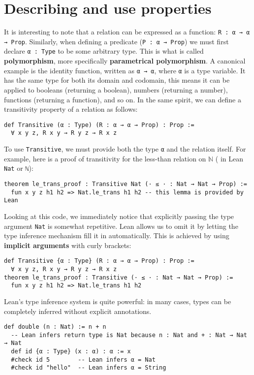 \section{Describing and use properties}
It is interesting to note that a relation can be expressed as a function:
\lstinline[language=lean]|R : α → α → Prop|.
Similarly, when defining a predicate (\lstinline[language=lean]|P : α → Prop|) we must first declare
\lstinline[language=lean]|α : Type| to be some arbitrary type.
This is what is called \textbf{polymorphism}, more specifically \textbf{parametrical polymorphism}.
A canonical example is the identity function, written as
\lstinline[language=lean]|α → α|, where
\lstinline[language=lean]|α| is a type variable.
It has the same type for
both its domain and codomain, this means it can be
applied to booleans (returning a boolean), numbers (returning a number),
functions (returning a function), and so on.
In the same spirit, we can define a transitivity property of a relation as follows:
\begin{lstlisting}[language=lean]
def Transitive (α : Type) (R : α → α → Prop) : Prop :=
  ∀ x y z, R x y → R y z → R x z
\end{lstlisting}
To use \lstinline[language=lean]|Transitive|, we must provide both the type
\lstinline[language=lean]|α| and the relation itself.
For example, here is a proof of transitivity for the less-than relation on
$\mathbb{N}$ ( in Lean \lstinline[language=lean]|Nat| or \lstinline[language=lean]|ℕ|):
\begin{lstlisting}[language=lean]
theorem le_trans_proof : Transitive Nat (· ≤ · : Nat → Nat → Prop) :=
  fun x y z h1 h2 => Nat.le_trans h1 h2 -- this lemma is provided by Lean 
\end{lstlisting}
Looking at this code, we immediately notice that explicitly
passing the type argument \lstinline[language=lean]|Nat| is somewhat repetitive.
Lean allows us to omit it by letting the type inference mechanism fill it in automatically.
This is achieved by using \textbf{implicit arguments} with curly brackets:
\begin{lstlisting}[language=lean]
def Transitive {α : Type} (R : α → α → Prop) : Prop :=
  ∀ x y z, R x y → R y z → R x z
theorem le_trans_proof : Transitive (· ≤ · : Nat → Nat → Prop) :=
  fun x y z h1 h2 => Nat.le_trans h1 h2 
\end{lstlisting}
Lean's type inference system is quite powerful: in many cases, types can be completely
inferred without explicit annotations.
\begin{example}\mbox{}
  \begin{lstlisting}[language=lean]
  def double (n : Nat) := n + n
  -- Lean infers return type is Nat because n : Nat and + : Nat → Nat → Nat
  def id {α : Type} (x : α) : α := x
  #check id 5        -- Lean infers α = Nat
  #check id "hello"  -- Lean infers α = String
  \end{lstlisting}
\end{example}
